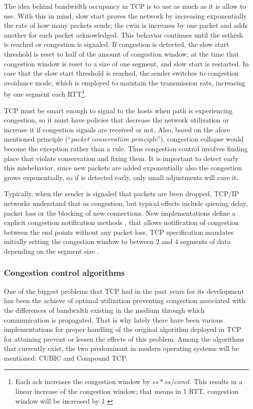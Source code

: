 The idea behind bandwidth occupancy in TCP is to use as much as it is allow to
use. With this in mind, slow start proves the network by increasing
exponentially the rate of how many packets sends; the \gls{cwin} is
increases by one packet and adds another for each packet acknowledged. This
behavior continues until the \gls{ssthrsh} is reached or
congestion is signaled. If congestion is detected, the slow start threshold is
reset to half of the amount of congestion window, at the time that congestion
window is reset to a size of one segment, and slow start is restarted. In case
that the slow start threshold is reached, the sender switches to congestion
avoidance mode, which is employed to maintain the transmission rate,
increasing by one segment each RTT\footnote{Each ack increases the congestion
window by $ss*ss/cwnd$. This results in a linear increase of the congestion
window; that means in 1 RTT, congestion window will be increased by
1 \cite{JacobsonCAC} \cite{rfc879} \cite{rfc2460}}.

TCP must be smart enough to signal to the hosts when path is experiencing
congestion, so it must have policies that decrease the network utilization or
increase it if congestion signals are received or not. Also, based on the
afore mentioned principle (``\textit{packet conservation principle}''),
congestion collapse would become the exception rather than a rule. Thus
congestion control involves finding place that violate conservation and fixing
them. It is important to detect early this misbehavior, since new packets are
added exponentially also the congestion grows exponentially, so if is detected
early, only small adjustments will cure it.

Typically, when the sender is signaled that packets are been dropped, TCP/IP
networks understand that as congestion, but typical effects include queuing
delay, packet loss or the blocking of new connections. New implementations
define a explicit congestion notification methods \cite{rfc3168}, that allows
notification of congestion between the end points without any packet loss. TCP
specification mandates initially setting the congestion window to between 2
and 4 segments of data depending on the segment size \cite{rfc3390}.

\subsubsection{Congestion control algorithms}
One of the biggest problems that TCP had in the past years for its development
has been the achieve of optimal utilization preventing congestion associated
with the differences of bandwidth existing in the medium through which
communication is propagated. That is why lately there have been various
implementations for proper handling of the original algorithm 
deployed in TCP for attaining prevent or lessen the effects of this problem.
Among the algorithms that currently exist, the two predominant in modern
operating systems will be mentioned: CUBIC and Compound TCP.


